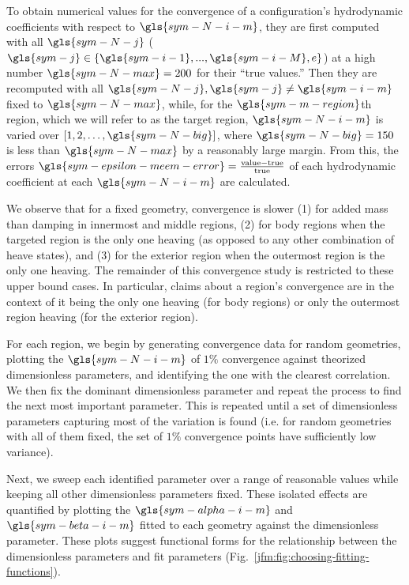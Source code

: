 \documentclass[lineno]{JFM-FLM_Au}
\begin{document}
To obtain numerical values for the convergence of a configuration's hydrodynamic coefficients with respect to $\gls{sym-N-i-m}$, 
they are first computed with all $\gls{sym-N-j}$ ($\gls{sym-j}\in\{\gls{sym-i-1},...,\gls{sym-i-M}, e\}$) at a high number $\gls{sym-N-max} = 200$ for their ``true values.'' 
Then they are recomputed with all $\gls{sym-N-j}, \gls{sym-j}\neq \gls{sym-i-m}$ fixed to $\gls{sym-N-max}$, while, for the $\gls{sym-m-region}$th region, which we will refer to as the target region, 
$\gls{sym-N-i-m}$ is varied over $[1, 2, \dots, \gls{sym-N-big}]$, where $\gls{sym-N-big} = 150$ is less than $\gls{sym-N-max}$ by a reasonably large margin. 
From this, the errors $\gls{sym-epsilon-meem-error} = \frac{\text{value}-\text{true}}{\text{true}}$ of each hydrodynamic coefficient at each $\gls{sym-N-i-m}$ are calculated.

We observe that for a fixed geometry, convergence is slower 
(1) for added mass than damping in innermost and middle regions, 
(2) for body regions when the targeted region is the only one heaving (as opposed to any other combination of heave states), and 
(3) for the exterior region when the outermost region is the only one heaving. 
The remainder of this convergence study is restricted to these upper bound cases. 
In particular, claims about a region's convergence are in the context of it being the only one heaving (for body regions) or only the outermost region heaving (for the exterior region).

For each region, we begin by generating convergence data for random geometries, plotting the $\gls{sym-N-i-m}$ of $1\%$ convergence against theorized dimensionless parameters, and identifying the one with the clearest correlation. 
We then fix the dominant dimensionless parameter and repeat the process to find the next most important parameter. 
This is repeated until a set of dimensionless parameters capturing most of the variation is found 
(i.e. for random geometries with all of them fixed, the set of $1\%$ convergence points have sufficiently low variance).

Next, we sweep each identified parameter over a range of reasonable values while keeping all other dimensionless parameters fixed. 
These isolated effects are quantified by plotting the $\gls{sym-alpha-i-m}$ and $\gls{sym-beta-i-m}$ fitted to each geometry against the dimensionless parameter. 
These plots suggest functional forms for the relationship between the dimensionless parameters and fit parameters (Fig.~\ref{jfm:fig:choosing-fitting-functions}).
\end{document}
